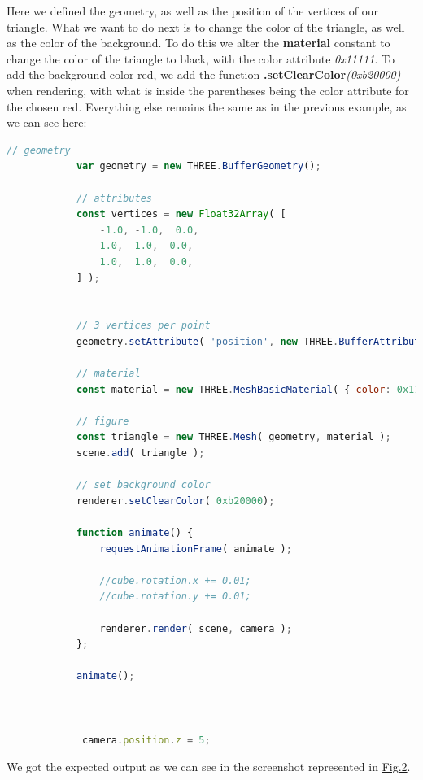 \documentclass{article}
\begin{document}
Here we defined the geometry, as well as the position of the vertices of our triangle. 
What we want to do next is to change the color of the triangle, as well as the color of the background. To do this we alter the \textbf{material} constant to change the color of the triangle to black, with the color attribute \textit{0x11111}. To add the background color red, we add the function \textbf{.setClearColor}\textit{(0xb20000)} when rendering, with what is inside the parentheses being the color attribute for the chosen red. Everything else remains the same as in the previous example, as we can see here:
\begin{lstlisting}[language=JavaScript, caption=2D Primitives and color.]
             // geometry
            var geometry = new THREE.BufferGeometry();

            // attributes
            const vertices = new Float32Array( [
                -1.0, -1.0,  0.0,
                1.0, -1.0,  0.0,
                1.0,  1.0,  0.0,
            ] );


            // 3 vertices per point
            geometry.setAttribute( 'position', new THREE.BufferAttribute( vertices, 3 ) );
            
            // material 
            const material = new THREE.MeshBasicMaterial( { color: 0x111111 } );
            
            // figure
            const triangle = new THREE.Mesh( geometry, material );
            scene.add( triangle );

            // set background color 
            renderer.setClearColor( 0xb20000);

			function animate() {
				requestAnimationFrame( animate );

				//cube.rotation.x += 0.01;
				//cube.rotation.y += 0.01;

				renderer.render( scene, camera );
			};

			animate();



			 camera.position.z = 5;

\end{lstlisting}

We got the expected output as we can see in the screenshot represented in \hyperref[fig:2dprimitives]{Fig.2}.
\end{document}
